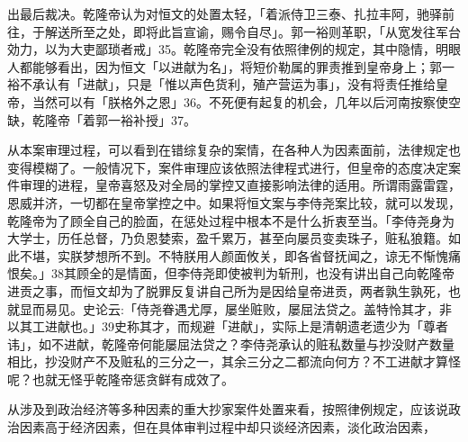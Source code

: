 \vfill
\begin{BookNotes}
\end{BookNotes}

\noindent 出最后裁决。乾隆帝认为对恒文的处置太轻，「着派侍卫三泰、扎拉丰阿，驰驿前往，于解送所至之处，即将此旨宣谕，赐令自尽」。郭一裕则革职，「从宽发往军台効力，以为大吏鄙琐者戒」35。乾隆帝完全没有依照律例的规定，其中隐情，明眼人都能够看出，因为恒文「以进献为名」，将短价勒属的罪责推到皇帝身上；郭一裕不承认有「进献」，只是「惟以声色货利，殖产营运为事」，没有将责任推给皇帝，当然可以有「朕格外之恩」36。不死便有起复的机会，几年以后河南按察使空缺，乾隆帝「着郭一裕补授」37。

从本案审理过程，可以看到在错综复杂的案情，在各种人为因素面前，法律规定也变得模糊了。一般情况下，案件审理应该依照法律程式进行，但皇帝的态度决定案件审理的进程，皇帝喜怒及对全局的掌控又直接影响法律的适用。所谓雨露雷霆，恩威并济，一切都在皇帝掌控之中。如果将恒文案与李侍尧案比较，就可以发现，乾隆帝为了顾全自己的脸面，在惩处过程中根本不是什么折衷至当。「李侍尧身为大学士，历任总督，乃负恩婪索，盈千累万，甚至向屡员变卖珠子，赃私狼籍。如此不堪，实朕梦想所不到。不特朕用人颜面攸关，即各省督抚闻之，谅无不惭愧痛恨矣。」38其顾全的是情面，但李侍尧即使被判为斩刑，也没有讲出自己向乾隆帝进贡之事，而恒文却为了脱罪反复讲自己所为是因给皇帝进贡，两者孰生孰死，也就显而易见。史论云:「侍尧眷遇尤厚，屡坐赃败，屡屈法贷之。盖特怜其才，非以其工进献也。」39史称其才，而规避「进献」，实际上是清朝遗老遗少为「尊者讳」，如不进献，乾隆帝何能屡屈法贷之？李侍尧承认的赃私数量与抄没财产数量相比，抄没财产不及赃私的三分之一，其余三分之二都流向何方？不工进献才算怪呢？也就无怪乎乾隆帝惩贪鲜有成效了。

从涉及到政治经济等多种因素的重大抄家案件处置来看，按照律例规定，应该说政治因素高于经济因素，但在具体审判过程中却只谈经济因素，淡化政治因素，

\vfill
\begin{BookNotes}
\end{BookNotes}

